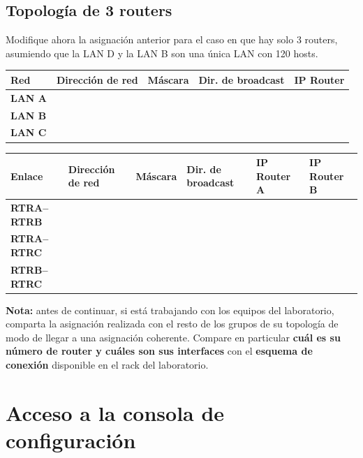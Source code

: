 \documentclass[a4paper,10pt]{article}
\begin{document}
\subsection{Topología de 3 routers}

    Modifique ahora la asignación anterior para el caso en que hay solo 3 routers, asumiendo que la LAN D y la LAN B son una única LAN con 120 hosts.

        \begin{center}
        \bigskip
        \begin{tabular}{|p{1cm}|p{3cm}|p{3cm}|p{3cm}|p{3cm}|}
            \hline
            \textbf{Red} & \textbf{Dirección de red} & \textbf{Máscara} & \textbf{Dir. de broadcast} & \textbf{IP Router} \\ \hline
            \textbf{LAN A} & & & & \\ \hline
            \textbf{LAN B} & & & & \\ \hline
            \textbf{LAN C} & & & & \\ \hline
        \end{tabular}
    \end{center}

    \bigskip
    \begin{center}
        \begin{tabular}{|p{2cm}|p{2.5cm}|p{2.5cm}|p{2.6cm}|p{2.4cm}|p{2.4cm}|}
            \hline
            \textbf{Enlace} & \textbf{Dirección de red} & \textbf{Máscara} & \textbf{Dir. de broadcast} & \textbf{IP Router A} & \textbf{IP Router B} \\ \hline
            \textbf{RTRA--RTRB} & & & & & \\ \hline
            \textbf{RTRA--RTRC} & & & & & \\ \hline
            \textbf{RTRB--RTRC} & & & & & \\ \hline
        \end{tabular}
    \bigskip
    \end{center}


\textbf{Nota:} antes de continuar, si está trabajando con los equipos del laboratorio, comparta la asignación realizada con el resto de los grupos de su topología de modo de llegar a una asignación coherente. Compare en particular \textbf{cuál es su número de router y cuáles son sus interfaces} con el \textbf{esquema de conexión} disponible en el rack del laboratorio.


\section{Acceso a la consola de configuración}
\end{document}
